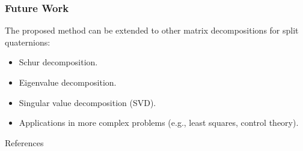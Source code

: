 \documentclass{beamer}
\begin{document}
\begin{frame}
    \frametitle{Future Work}
    The proposed method can be extended to other matrix decompositions for split quaternions:
    \begin{itemize}
        \item Schur decomposition.
        \item Eigenvalue decomposition.
        \item Singular value decomposition (SVD).
        \item Applications in more complex problems (e.g., least squares, control theory).
    \end{itemize}
\end{frame}

\begin{frame}[allowframebreaks]{References}
  \printbibliography
\end{frame}
\end{document}
